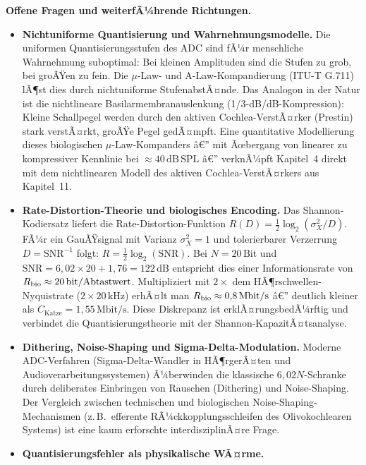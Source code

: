 ﻿\documentclass[12pt,a4paper,titlepage]{report}
\begin{document}
\textbf{Offene Fragen und weiterfÃ¼hrende Richtungen.}
\begin{itemize}[leftmargin=2em]
  \item \textbf{Nichtuniforme Quantisierung und Wahrnehmungsmodelle.}
    Die uniformen Quantisierungsstufen des ADC sind fÃ¼r
    menschliche Wahrnehmung suboptimal:
    Bei kleinen Amplituden sind die Stufen zu grob,
    bei groÃŸen zu fein.
    Die $\mu$-Law- und A-Law-Kompandierung (ITU-T G.711)
    lÃ¶st dies durch nichtuniforme StufenabstÃ¤nde.
    Das Analogon in der Natur ist die nichtlineare
    Basilarmembranauslenkung (1/3-dB/dB-Kompression):
    Kleine Schallpegel werden durch den aktiven
    Cochlea-VerstÃ¤rker (Prestin) stark verstÃ¤rkt,
    groÃŸe Pegel gedÃ¤mpft.
    Eine quantitative Modellierung dieses biologischen
    $\mu$-Law-Kompanders â€” mit Ãœbergang von linearer
    zu kompressiver Kennlinie bei $\approx 40\,\mathrm{dB\,SPL}$ â€”
    verknÃ¼pft Kapitel~4 direkt mit dem nichtlinearen Modell
    des aktiven Cochlea-VerstÃ¤rkers aus Kapitel~11.
  \item \textbf{Rate-Distortion-Theorie und biologisches Encoding.}
    Das Shannon-Kodiersatz liefert die Rate-Distortion-Funktion
    $R(D) = \tfrac{1}{2}\log_2(\sigma_X^2/D)$.
    FÃ¼r ein GauÃŸsignal mit Varianz $\sigma_X^2=1$ und
    tolerierbarer Verzerrung $D=\mathrm{SNR}^{-1}$ folgt:
    $R = \tfrac{1}{2}\log_2(\mathrm{SNR})$.
    Bei $N=20\,\mathrm{Bit}$ und $\mathrm{SNR}=6{,}02\times20+1{,}76=122\,\mathrm{dB}$
    entspricht dies einer Informationsrate von
    $R_{\rm bio}\approx 20\,\mathrm{bit/Abtastwert}$.
    Multipliziert mit $2 \times$ dem HÃ¶rschwellen-Nyquistrate
    ($2 \times 20\,\mathrm{kHz}$) erhÃ¤lt man
    $R_{\rm bio} \approx 0{,}8\,\mathrm{Mbit/s}$ â€”
    deutlich kleiner als $C_\mathrm{Katze}=1{,}55\,\mathrm{Mbit/s}$.
    Diese Diskrepanz ist erklÃ¤rungsbedÃ¼rftig und verbindet die
    Quantisierungstheorie mit der Shannon-KapazitÃ¤tsanalyse.
  \item \textbf{Dithering, Noise-Shaping und Sigma-Delta-Modulation.}
    Moderne ADC-Verfahren (Sigma-Delta-Wandler in HÃ¶rgerÃ¤ten und
    Audioverarbeitungssystemen) Ã¼berwinden die klassische
    $6{,}02N$-Schranke durch deliberates Einbringen von Rauschen
    (Dithering) und Noise-Shaping.
    Der Vergleich zwischen technischen und biologischen
    Noise-Shaping-Mechanismen (z.\,B.\ efferente RÃ¼ckkopplungsschleifen
    des Olivokochlearen Systems) ist eine kaum erforschte
    interdisziplinÃ¤re Frage.
  \item \textbf{Quantisierungsfehler als physikalische WÃ¤rme.}

\end{itemize}
\end{document}
